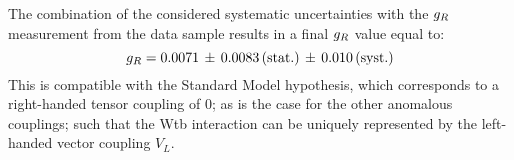 

The combination of the considered systematic uncertainties with the $g_{R}$ measurement from the data sample results in a final $g_{R}$ value equal to:
\begin{equation}
 g_{R} = 0.0071 \, \pm \, 0.0083 \, (\textrm{stat.}) \, \pm \, 0.010  \, (\textrm{syst.})
\end{equation}
This is compatible with the Standard Model hypothesis, which corresponds to a right-handed tensor coupling of $0$; as is the case for the other anomalous couplings; such that the Wtb interaction can be uniquely represented by the left-handed vector coupling $V_L$.

